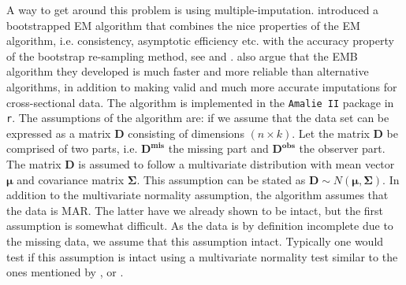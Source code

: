 \documentclass[../thesis.tex]{subfiles}
\begin{document}
\indent A way to get around this problem is using multiple-imputation. \cite{honaker2011amelia}  introduced a bootstrapped EM algorithm that combines the nice properties of the EM algorithm, i.e. consistency, asymptotic efficiency etc. with the accuracy property of the bootstrap re-sampling method, see \cite{efron1992bootstrap} and \cite{james2013introduction}. \cite{honaker2011amelia} also argue that the EMB algorithm they developed is much faster and more reliable than alternative algorithms, in addition to making valid and much more accurate imputations for cross-sectional data. The algorithm is implemented in the \texttt{Amalie II} package in \texttt{r}. The assumptions of the algorithm are: if we assume that the data set can be expressed as a matrix $\boldsymbol{D}$ consisting of dimensions $(n\times k)$. Let the matrix $\boldsymbol{D}$ be comprised of two parts, i.e. $\boldsymbol{D^{mis}}$ the missing part and $\boldsymbol{D^{obs}}$ the observer part. The matrix $\boldsymbol{D}$ is assumed to follow a multivariate distribution with mean vector $\boldsymbol{\mu}$ and covariance matrix $\boldsymbol{\Sigma}$. This assumption can be stated as $\boldsymbol{D} \sim N\left(\boldsymbol{\mu},  \boldsymbol{\Sigma}\right)$. In addition to the multivariate normality assumption, the algorithm assumes that the data is MAR. The latter have we already shown to be intact, but the first assumption is somewhat difficult. As the data is by definition incomplete due to the missing data, we assume that this assumption intact. Typically one would test if this assumption is intact using a multivariate normality test similar to the ones mentioned by \cite{mardia1970measures}, \cite{henze1990class} or \cite{royston1982extension}.


\end{document}
